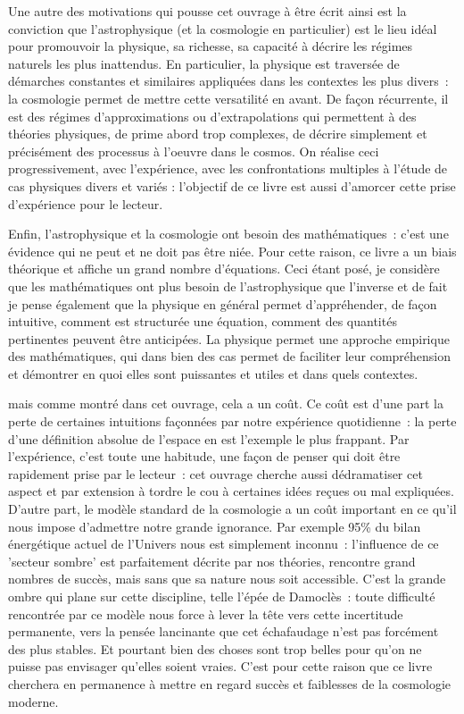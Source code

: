 Une autre des motivations qui pousse cet ouvrage à être écrit ainsi est la conviction que l'astrophysique (et la cosmologie en particulier) est le lieu idéal pour promouvoir la physique, sa richesse, sa capacité à décrire les régimes naturels les plus inattendus. En particulier, la physique est traversée de démarches constantes et similaires appliquées dans les contextes les plus divers~: la cosmologie permet de mettre cette versatilité en avant. De façon récurrente, il est des régimes d'approximations ou d'extrapolations qui permettent à des théories physiques, de prime abord trop complexes, de décrire simplement et précisément des processus à l'oeuvre dans le cosmos. On réalise ceci progressivement, avec l'expérience, avec les confrontations multiples à l'étude de cas physiques divers et variés : l'objectif de ce livre est aussi d'amorcer cette prise d'expérience pour le lecteur.

Enfin, l'astrophysique et la cosmologie ont besoin des mathématiques~: c'est une évidence qui ne peut et ne doit pas être niée. Pour cette raison, ce livre a un biais théorique et affiche un grand nombre d'équations. Ceci étant posé, je considère que les mathématiques ont plus besoin de l'astrophysique que l'inverse et de fait je pense également que la physique en général permet d'appréhender, de façon intuitive, comment est structurée une équation, comment des quantités pertinentes peuvent être anticipées. La physique permet une approche empirique des mathématiques, qui dans bien des cas permet de faciliter leur compréhension et démontrer en quoi elles sont puissantes et utiles et dans quels contextes.

 mais comme montré dans cet ouvrage, cela a un coût. Ce coût est d'une part la perte de certaines intuitions façonnées par notre expérience quotidienne~: la perte d'une définition absolue de l'espace en est l'exemple le plus frappant. Par l'expérience, c'est toute une habitude, une façon de penser qui doit être rapidement prise par le lecteur~: cet ouvrage cherche aussi dédramatiser cet aspect et par extension à tordre le cou à certaines idées reçues ou mal expliquées. D'autre part, le modèle standard de la cosmologie a un coût important en ce qu'il nous impose d'admettre notre grande ignorance. Par exemple 95\% du bilan énergétique actuel de l'Univers nous est simplement inconnu~: l'influence de ce 'secteur sombre' est parfaitement décrite par nos théories, rencontre grand nombres de succès, mais sans que sa nature nous soit accessible. C'est la grande ombre qui plane sur cette discipline, telle l'épée de Damoclès~: toute difficulté rencontrée par ce modèle nous force à lever la tête vers cette incertitude permanente, vers la pensée lancinante que cet échafaudage n'est pas forcément des plus stables. Et pourtant bien des choses sont trop belles pour qu'on ne puisse pas envisager qu'elles soient vraies. C'est pour cette raison que ce livre cherchera en permanence à mettre en regard succès et faiblesses de la cosmologie moderne.

